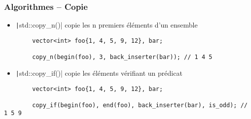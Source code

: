\documentclass[C++.tex]{subfiles}
\begin{document}
\begin{frame}[fragile]
	\frametitle{Algorithmes -- Copie}
	\begin{itemize}
		\item \texttt|std::copy_n()| copie les n premiers éléments d'un ensemble
	\end{itemize}

	\begin{verbatim}
		vector<int> foo{1, 4, 5, 9, 12}, bar;

		copy_n(begin(foo), 3, back_inserter(bar)); // 1 4 5
	\end{verbatim}

	\begin{itemize}
		\item \texttt|std::copy_if()| copie les éléments vérifiant un prédicat
	\end{itemize}

	\begin{verbatim}
		vector<int> foo{1, 4, 5, 9, 12}, bar;

		copy_if(begin(foo), end(foo), back_inserter(bar), is_odd); // 1 5 9
	\end{verbatim}

\end{frame}
\end{document}
